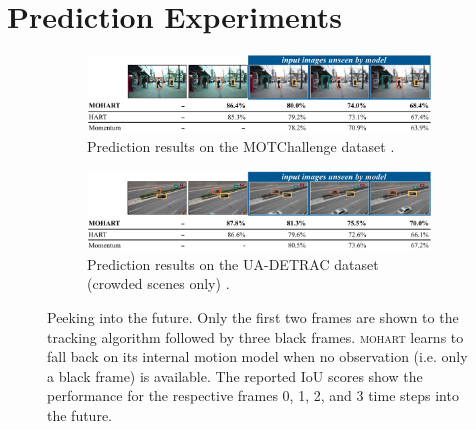 \section{Prediction Experiments}
\label{sec:exp_pred}

\begin{figure}
    \centering
    \begin{subfigure}[c]{0.99\linewidth}
        \centering
        \includegraphics[width=\linewidth]{figures/MOHART/prediction_motc2.png}
        \vspace{-6mm}
        \caption{Prediction results on the MOTChallenge dataset \cite{Mot16}.}
        \label{fig:MOTC_imgs}
    \end{subfigure}
    \vspace{2mm}
    \begin{subfigure}[c]{0.99\linewidth}
        \centering
        \includegraphics[width=\linewidth]{figures/MOHART/prediction_detrac2.png}
        \vspace{-6mm}
        \caption{Prediction results on the UA-DETRAC dataset (crowded scenes only) \cite{Wen15}.}
        \label{fig:Detrac_quant}
    \vspace{-5mm}
    \end{subfigure}
\caption{Peeking into the future. Only the first two frames are shown to the tracking algorithm followed by three black frames. \textsc{mohart} learns to fall back on its internal motion model when no observation (i.e. only a black frame) is available. The reported IoU scores show the performance for the respective frames 0, 1, 2, and 3 time steps into the future.
\label{fig:prediction}
}
\end{figure}

